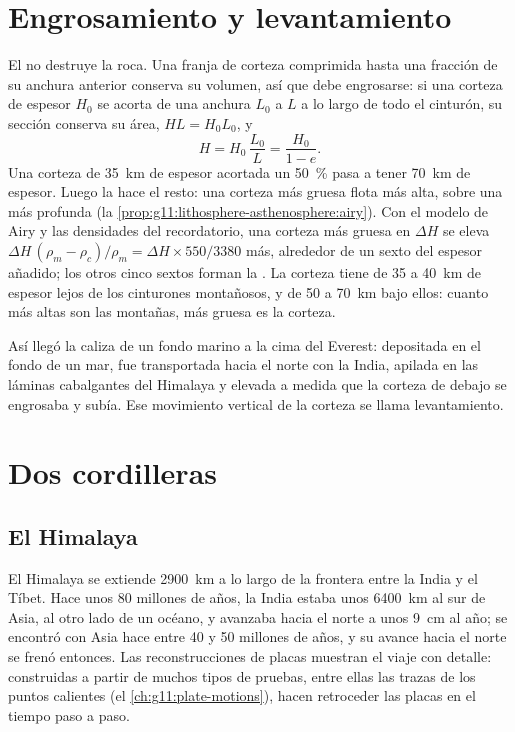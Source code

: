 \section{Engrosamiento y levantamiento}

El  no destruye la roca. Una franja de corteza comprimida hasta
una fracción de su anchura anterior conserva su volumen, así que debe
engrosarse: si una corteza de espesor
$H_0$ se acorta de una anchura $L_0$ a $L$ a lo largo de todo el cinturón,
su sección conserva su área, $H L = H_0 L_0$, y
\[
  H = H_0\,\frac{L_0}{L} = \frac{H_0}{1 - e}.
\]
Una corteza de \qty{35}{km} de espesor acortada un \qty{50}{\percent} pasa a
tener \qty{70}{km} de espesor. Luego la  hace el resto: una corteza
más gruesa flota más alta, sobre una  más profunda (la
\cref{prop:g11:lithosphere-asthenosphere:airy}). Con el modelo de Airy y las
densidades del recordatorio, una corteza más gruesa en
$\Delta H$ se eleva $\Delta H\,(\rho_m - \rho_c)/\rho_m = \Delta H
\times 550/3380$ más, alrededor de un sexto del espesor añadido; los otros
cinco sextos forman la . La corteza tiene de \num{35} a \qty{40}{km} de
espesor lejos de los cinturones montañosos, y de 50 a \qty{70}{km} bajo
ellos: cuanto más altas son las montañas, más gruesa es la corteza.

Así llegó la caliza de un fondo marino a la cima del Everest: depositada en el
fondo de un mar, fue transportada hacia el norte con la India, apilada en las
láminas cabalgantes del Himalaya y elevada a medida que la corteza de debajo
se engrosaba y subía. Ese movimiento vertical de la corteza se llama
levantamiento.

\section{Dos cordilleras}

\subsection{El Himalaya}

El Himalaya se extiende \qty{2900}{km} a lo largo de la frontera entre la
India y el Tíbet. Hace unos 80 millones de años, la India estaba unos
\qty{6400}{km} al sur de Asia, al otro lado de un océano, y avanzaba hacia el
norte a unos \qty{9}{cm} al año; se encontró con Asia hace entre 40 y 50
millones de años, y su avance hacia el norte se frenó entonces. Las
reconstrucciones de placas muestran el viaje con detalle: construidas a partir
de muchos tipos de pruebas, entre ellas las trazas de los puntos calientes
(el \cref{ch:g11:plate-motions}), hacen retroceder las placas en el tiempo paso
a paso.

